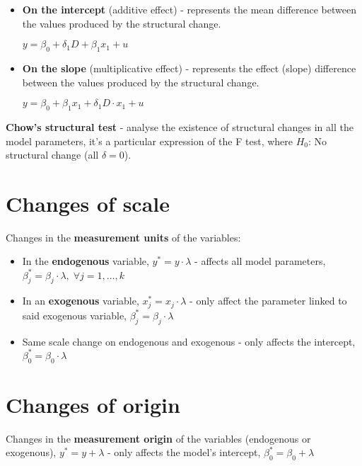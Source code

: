\documentclass[10pt, a4paper, landscape]{article}
\begin{document}
\begin{multicols}{3}
\begin{itemize}[leftmargin=*]
	\item \textbf{On the intercept} (additive effect) - represents the mean difference between the values produced by the structural change.
	\begin{center}
		\( y = \beta_{0} + \delta_{1} D + \beta_{1} x_{1} + u \)
	\end{center}
	\item \textbf{On the slope} (multiplicative effect) - represents the effect (slope) difference between the values produced by the structural change.
	\begin{center}
		\( y = \beta_{0} + \beta_{1} x_{1} + \delta_{1} D \cdot x_{1} + u \)
	\end{center}
\end{itemize}

\textbf{Chow's structural test} - analyse the existence of structural changes in all the model parameters, it's a particular expression of the F test, where \( H_{0} \): No structural change (all \( \delta = 0 \)).

\section*{Changes of scale}

Changes in the \textbf{measurement units} of the variables:

\begin{itemize}[leftmargin=*]
	\item In the \textbf{endogenous} variable, \( y^{*} = y \cdot \lambda \) - affects all model parameters, \( \beta_{j}^{*} = \beta_{j} \cdot \lambda, \; \forall j = 1, \ldots, k \)
	\item In an \textbf{exogenous} variable, \( x_{j}^{*} = x_{j} \cdot \lambda \) - only affect the parameter linked to said exogenous variable, \( \beta_{j}^{*} = \beta_{j} \cdot \lambda \)
	\item Same scale change on endogenous and exogenous - only affects the intercept, \( \beta_{0}^{*} = \beta_{0} \cdot \lambda \)
\end{itemize}

\section*{Changes of origin}

Changes in the \textbf{measurement origin} of the variables (endogenous or exogenous), \( y^{*} = y + \lambda \) - only affects the model's intercept, \( \beta_{0}^{*} = \beta_{0} + \lambda \)


\end{multicols}
\end{document}
